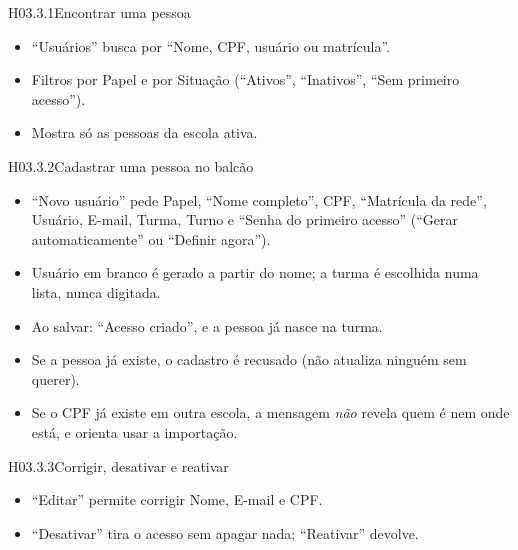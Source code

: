 \begin{historia}{H03.3.1}{Encontrar uma pessoa}{\parcial}
\aceite
\begin{itemize}
  \item \enquote{Usuários} busca por \enquote{Nome, CPF, usuário ou
    matrícula}.
  \item Filtros por Papel e por Situação (\enquote{Ativos},
    \enquote{Inativos}, \enquote{Sem primeiro acesso}).
  \item Mostra só as pessoas da escola ativa.
\end{itemize}
\end{historia}

\begin{historia}{H03.3.2}{Cadastrar uma pessoa no balcão}{\pronto}
\aceite
\begin{itemize}
  \item \enquote{Novo usuário} pede Papel, \enquote{Nome completo}, CPF,
    \enquote{Matrícula da rede}, Usuário, E-mail, Turma, Turno e
    \enquote{Senha do primeiro acesso} (\enquote{Gerar automaticamente} ou
    \enquote{Definir agora}).
  \item Usuário em branco é gerado a partir do nome; a turma é escolhida numa
    lista, nunca digitada.
  \item Ao salvar: \enquote{Acesso criado}, e a pessoa já nasce na turma.
  \item Se a pessoa já existe, o cadastro é recusado (não atualiza ninguém sem
    querer).
  \item Se o CPF já existe em outra escola, a mensagem \emph{não} revela quem é
    nem onde está, e orienta usar a importação.
\end{itemize}
\end{historia}

\begin{historia}{H03.3.3}{Corrigir, desativar e reativar}{\pronto}
\aceite
\begin{itemize}
  \item \enquote{Editar} permite corrigir Nome, E-mail e CPF.
  \item \enquote{Desativar} tira o acesso sem apagar nada; \enquote{Reativar}
    devolve.
\end{itemize}
\end{historia}

